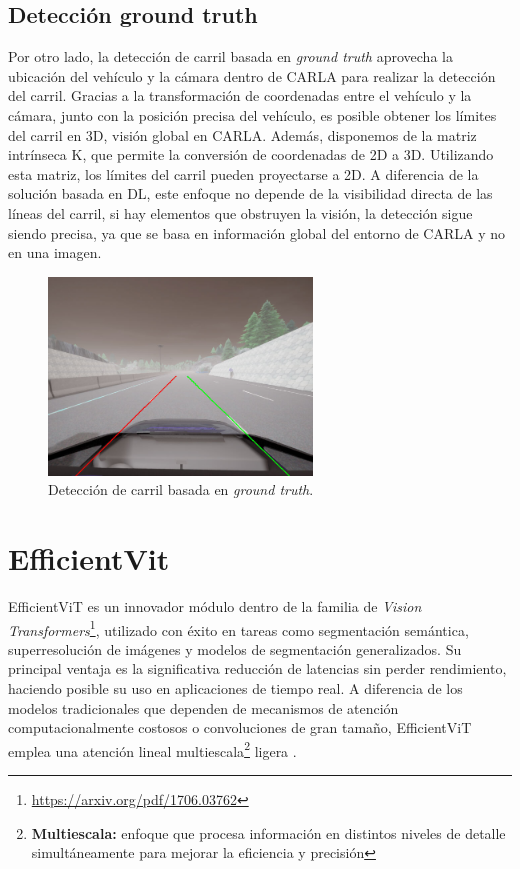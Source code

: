 \subsection{Detección ground truth}
\label{sec:gt}

Por otro lado, la detección de carril basada en \textit{ground truth} aprovecha la ubicación del vehículo y la cámara dentro de CARLA para realizar la detección del carril. Gracias a la transformación de coordenadas entre el vehículo y la cámara, junto con la posición precisa del vehículo, es posible obtener los límites del carril en 3D, visión global en CARLA. Además, disponemos de la matriz intrínseca K, que permite la conversión de coordenadas de 2D a 3D. Utilizando esta matriz, los límites del carril pueden proyectarse a 2D. A diferencia de la solución basada en \ac{DL}, este enfoque no depende de la visibilidad directa de las líneas del carril, si hay elementos que obstruyen la visión, la detección sigue siendo precisa, ya que se basa en información global del entorno de CARLA y no en una imagen.

\begin{figure}[ht]
  \begin{center}
    \includegraphics[width=7cm]{figs/Plataformas_Desarollo/ground_truth.png}
  \end{center}
  \caption{Detección de carril basada en \textit{ground truth}.}
  \label{dl_lane}
\end{figure}

\section{EfficientVit}
\label{sec:ef}

EfficientViT es un innovador módulo dentro de la familia de \textit{Vision Transformers}\footnote{\url{https://arxiv.org/pdf/1706.03762}}, utilizado con éxito en tareas como segmentación semántica, superresolución de imágenes y modelos de segmentación generalizados. Su principal ventaja es la significativa reducción de latencias sin perder rendimiento, haciendo posible su uso en aplicaciones de tiempo real. A diferencia de los modelos tradicionales que dependen de mecanismos de atención computacionalmente costosos o convoluciones de gran tamaño, EfficientViT emplea una atención lineal multiescala\footnote{\textbf{Multiescala:} enfoque que procesa información en distintos niveles de detalle simultáneamente para mejorar la eficiencia y precisión} ligera \cite{efficientvit}.

